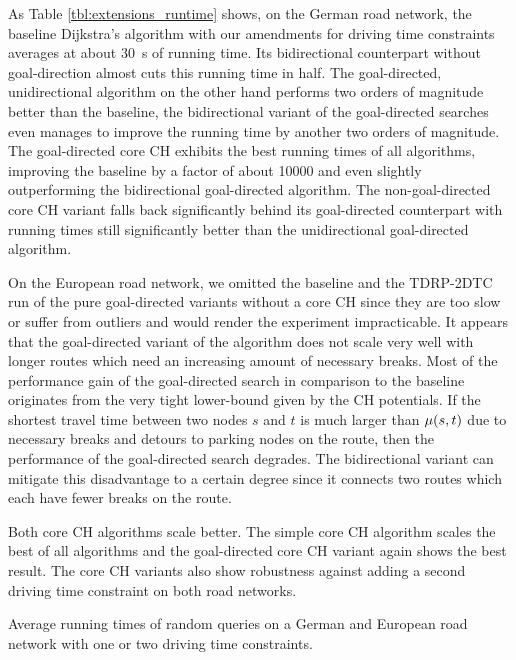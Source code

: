 As Table \ref{tbl:extensions_runtime} shows, on the German road network, the baseline Dijkstra's algorithm with our amendments for driving time constraints averages at about \SI{30}{\second} of running time. Its bidirectional counterpart without goal-direction almost cuts this running time in half. The goal-directed, unidirectional algorithm on the other hand performs two orders of magnitude better than the baseline, the bidirectional variant of the goal-directed searches even manages to improve the running time by another two orders of magnitude. The goal-directed core CH exhibits the best running times of all algorithms, improving the baseline by a factor of about \num{10000} and even slightly outperforming the bidirectional goal-directed algorithm. The non-goal-directed core CH variant falls back significantly behind its goal-directed counterpart with running times still significantly better than the unidirectional goal-directed algorithm.

On the European road network, we omitted the baseline and the TDRP-2DTC run of the pure goal-directed variants without a core CH since they are too slow or suffer from outliers and would render the experiment impracticable. It appears that the goal-directed variant of the algorithm does not scale very well with longer routes which need an increasing amount of necessary breaks. Most of the performance gain of the goal-directed search in comparison to the baseline originates from the very tight lower-bound given by the CH potentials. If the shortest travel time between two nodes $s$ and $t$ is much larger than $\mu(s,t)$ due to necessary breaks and detours to parking nodes on the route, then the performance of the goal-directed search degrades. The bidirectional variant can mitigate this disadvantage to a certain degree since it connects two routes which each have fewer breaks on the route.

Both core CH algorithms scale better. The simple core CH algorithm scales the best of all algorithms and the goal-directed core CH variant again shows the best result. The core CH variants also show robustness against adding a second driving time constraint on both road networks.

\begin{table}[btp]
	\centering
	
	\caption{Average running times of random queries on a German and European road network with one or two driving time constraints.}
	\label{tbl:extensions_runtime}
\end{table}

